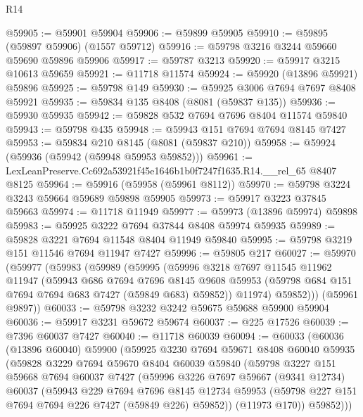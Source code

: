 \begin{lexlean}{R14}
\begin{coremodule}
@59905 := @59901 @59904
@59906 := @59899 @59905
@59910 := @59895 (@59897 @59906) (@1557 @59712)
@59916 := @59798 @3216 @3244 @59660 @59690 @59896 @59906
@59917 := @59787 @3213
@59920 := @59917 @3215 @10613 @59659
@59921 := @11718 @11574
@59924 := @59920 (@13896 @59921) @59896
@59925 := @59798 @149
@59930 := @59925 @3006 @7694 @7697 @8408 @59921
@59935 := @59834 @135 @8408 (@8081 (@59837 @135))
@59936 := @59930 @59935
@59942 := @59828 @532 @7694 @7696 @8404 @11574 @59840
@59943 := @59798 @435
@59948 := @59943 @151 @7694 @7694 @8145 @7427
@59953 := @59834 @210 @8145 (@8081 (@59837 @210))
@59958 := @59924 (@59936 (@59942 (@59948 @59953 @59852)))
@59961 := LexLeanPreserve.Cc692a53921f45e1646b1b0f7247f1635.R14.__rel_65 @8407 @8125
@59964 := @59916 (@59958 (@59961 @8112))
@59970 := @59798 @3224 @3243 @59664 @59689 @59898 @59905
@59973 := @59917 @3223 @37845 @59663
@59974 := @11718 @11949
@59977 := @59973 (@13896 @59974) @59898
@59983 := @59925 @3222 @7694 @37844 @8408 @59974 @59935
@59989 := @59828 @3221 @7694 @11548 @8404 @11949 @59840
@59995 := @59798 @3219 @151 @11546 @7694 @11947 @7427
@59996 := @59805 @217
@60027 := @59970
    (@59977
      (@59983
        (@59989
          (@59995
            (@59996
              @3218
              @7697
              @11545
              @11962
              @11947
              (@59943
                @686
                @7694
                @7696
                @8145
                @9608
                @59953
                (@59798 @684 @151 @7694 @7694 @683 @7427 (@59849 @683) @59852))
              @11974)
            @59852)))
      (@59961 @9897))
@60033 := @59798 @3232 @3242 @59675 @59688 @59900 @59904
@60036 := @59917 @3231 @59672 @59674
@60037 := @225 @17526
@60039 := @7396 @60037 @7427
@60040 := @11718 @60039
@60094 := @60033
    (@60036
      (@13896 @60040)
      @59900
      (@59925
        @3230
        @7694
        @59671
        @8408
        @60040
        @59935
        (@59828
          @3229
          @7694
          @59670
          @8404
          @60039
          @59840
          (@59798
            @3227
            @151
            @59668
            @7694
            @60037
            @7427
            (@59996
              @3226
              @7697
              @59667
              (@9341 @12734)
              @60037
              (@59943
                @229
                @7694
                @7696
                @8145
                @12734
                @59953
                (@59798 @227 @151 @7694 @7694 @226 @7427 (@59849 @226) @59852))
              (@11973 @170))
            @59852)))

\end{coremodule}
\end{lexlean}
